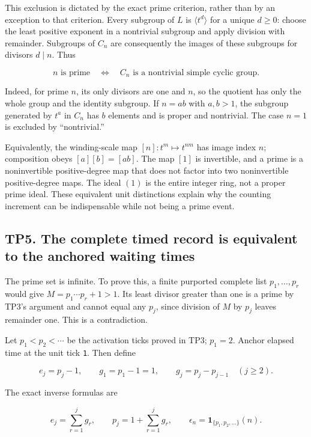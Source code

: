 \documentclass[
]{article}
\begin{document}
This exclusion is dictated by the exact prime criterion, rather than by
an exception to that criterion. Every subgroup of \(L\) is
\(\langle t^d\rangle\) for a unique \(d\ge0\): choose the least positive
exponent in a nontrivial subgroup and apply division with remainder.
Subgroups of \(C_n\) are consequently the images of these subgroups for
divisors \(d\mid n\). Thus

\[
n\text{ is prime}
\quad\Longleftrightarrow\quad
C_n\text{ is a nontrivial simple cyclic group}.
\]

Indeed, for prime \(n\), its only divisors are one and \(n\), so the
quotient has only the whole group and the identity subgroup. If \(n=ab\)
with \(a,b>1\), the subgroup generated by \(t^a\) in \(C_n\) has \(b\)
elements and is proper and nontrivial. The case \(n=1\) is excluded by
``nontrivial.''

Equivalently, the winding-scale map \([n]:t^m\mapsto t^{nm}\) has image
index \(n\); composition obeys \([a][b]=[ab]\). The map \([1]\) is
invertible, and a prime is a noninvertible positive-degree map that does
not factor into two noninvertible positive-degree maps. The ideal
\((1)\) is the entire integer ring, not a proper prime ideal. These
equivalent unit distinctions explain why the counting increment can be
indispensable while not being a prime event.

\subsection{TP5. The complete timed record is equivalent to the anchored
waiting
times}\label{tp5.-the-complete-timed-record-is-equivalent-to-the-anchored-waiting-times}

The prime set is infinite. To prove this, a finite purported complete
list \(p_1,\ldots,p_r\) would give \(M=p_1\cdots p_r+1>1\). Its least
divisor greater than one is a prime by TP3's argument and cannot equal
any \(p_j\), since division of \(M\) by \(p_j\) leaves remainder one.
This is a contradiction.

Let \(p_1<p_2<\cdots\) be the activation ticks proved in TP3; \(p_1=2\).
Anchor elapsed time at the unit tick \texttt{1}. Then define

\[
e_j=p_j-1,\qquad
g_1=p_1-1=1,\qquad
g_j=p_j-p_{j-1}\quad(j\ge2).
\]

The exact inverse formulas are

\[
e_j=\sum_{r=1}^{j}g_r,
\qquad
p_j=1+\sum_{r=1}^{j}g_r,
\qquad
\epsilon_n=\mathbf1_{\{p_1,p_2,\ldots\}}(n).
\]
\end{document}
